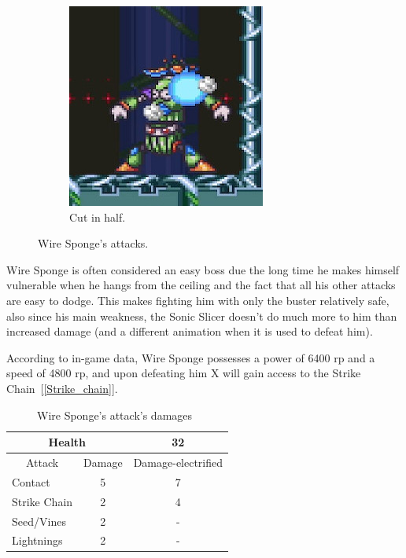 \begin{figure}[htp]
	\begin{subfigure}{0.35\linewidth}
		\centering
		\includegraphics[width=\linewidth]{figures/X2/Wire_sponge/Sponge_cut.jpg}
		\caption{Cut in half.}
	\end{subfigure}
	
	\caption{Wire Sponge's attacks.}
\end{figure}

Wire Sponge is often considered an easy boss due the long time he makes himself vulnerable when he hangs from the ceiling and the fact that all his other attacks are easy to dodge. This makes fighting him with only the buster relatively safe, also since his main weakness, the Sonic Slicer doesn't do much more to him than increased damage (and a different animation when it is used to defeat him).

According to in-game data, Wire Sponge possesses a power of 6400 rp and a speed of 4800 rp, and upon defeating him X will gain access to the Strike Chain~[\ref{Strike_chain}].
\begin{table}[htp]
	\centering
	\begin{tabular}[h]{l c c}
		
		\toprule
		\multicolumn{2}{c}{Health}  & 32\\
		\midrule
		\multicolumn{1}{c}{Attack} & \multicolumn{1}{c}{Damage}& \multicolumn{1}{c}{Damage-electrified}\\
		Contact & 5 & 7\\
		Strike Chain & 2 & 4\\
		Seed/Vines& 2&-\\
		Lightnings & 2&-\\
		\bottomrule
	\end{tabular}
	\caption{Wire Sponge's attack's damages~\cite{wiki:wire_sponge}}
\end{table}


